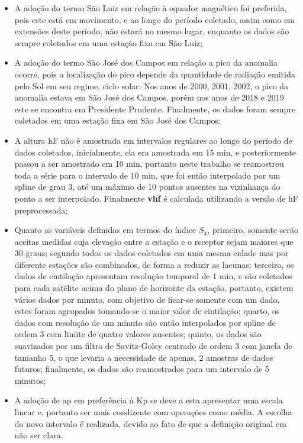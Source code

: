 \begin{itemize}
\item A adoção do termo São Luiz em relação à equador magnético foi preferida, pois este está em movimento, e ao longo do período coletado, assim como em extensões deste período, não estará no mesmo lugar, enquanto os dados são sempre coletados em uma estação fixa em São Luiz;
\item A adoção do termo São José dos Campos em relação a pico da anomalia ocorre, pois a localização do pico depende da quantidade de radiação emitida pelo Sol em seu regime, ciclo solar. Nos anos de 2000, 2001, 2002, o pico da anomalia estava em São José dos Campos, porém nos anos de 2018 e 2019 este se encontra em Presidente Prudente. Finalmente, os dados foram sempre coletados em uma estação fixa em São José dos Campos;
\item A altura hF não é amostrada em intervalos regulares ao longo do período de dados coletados, inicialmente, ela era amostrada em 15 min, e posteriormente passou a ser amostrado em 10 min, portanto neste trabalho se reamostrou toda a série para o intervalo de 10 min, que foi então interpolado por um spline de grau 3, até um máximo de 10 pontos ausentes na vizinhança do ponto a ser interpolado. Finalmente {\bf vhf} é calculada utilizando a versão de hF preprocessada;
\item Quanto as variáveis definidas em termos do índice $S_4$, primeiro, somente serão aceitas medidas cuja elevação entre a estação e o receptor sejam maiores que 30 graus; segundo todos os dados coletados em uma mesma cidade mas por diferente estações são combinados, de forma a reduzir as lacunas; terceiro, os dados de cintilação apresentam resolução temporal de 1 min, e são coletados para cada satélite acima do plano de horizonte da estação, portanto, existem vários dados por minuto, com objetivo de ficar-se somente com um dado, estes foram agrupados tomando-se o maior valor de cintilação; quarto, os dados com resolução de um minuto são então interpolados por spline de ordem 3 com limite de quatro valores ausentes; quinto, os dados são suavizados por um filtro de Savitz-Goley centrado de ordem 3 com janela de tamanho 5, o que levaria a necessidade de apenas, 2 amostras de dados futuros; finalmente, os dados são reamostrados para um intervalo de 5 minutos;
\item A adoção de ap em preferência à Kp se deve a esta apresentar uma escala linear e, portanto ser mais condizente com operações como média. A escolha do novo intervalo é realizada, devido ao fato de que a definição original em \cite{REZENDE:2009, REZENDE:2010} não ser clara.
\end{itemize}

